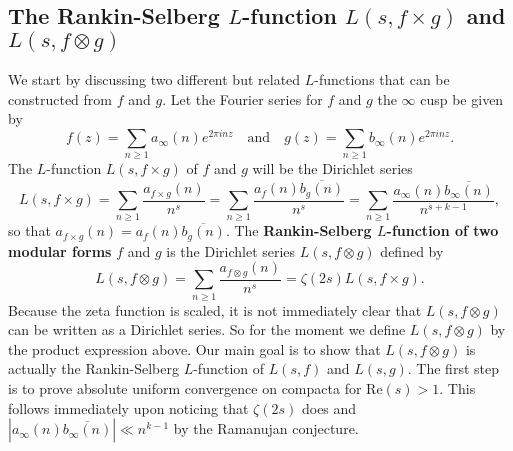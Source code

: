\documentclass[12pt]{book}
\theoremstyle{definition}\newframedtheorem{method}{Method}
\newcommand{\z}{\zeta}
\newcommand{\x}{\times}
\newcommand{\ox}{\otimes}
\newcommand{\<}{\langle}
\renewcommand{\>}{\rangle}
\newcommand{\conj}{\overline}
\renewcommand{\Re}{\mathrm{Re}}
\begin{document}
    \subsection*{The Rankin-Selberg \texorpdfstring{$L$}{L}-function \texorpdfstring{$L(s,f \x g)$}{L(s,fxg)} and \texorpdfstring{$L(s,f \ox g)$}{L(s,foxg)}}
      We start by discussing two different but related $L$-functions that can be constructed from $f$ and $g$. Let the Fourier series for $f$ and $g$ the $\infty$ cusp be given by
      \[
        f(z) = \sum_{n \ge 1}a_{\infty}(n)e^{2\pi inz} \quad \text{and} \quad g(z) = \sum_{n \ge 1}b_{\infty}(n)e^{2\pi inz}.
      \]
      The $L$-function $L(s,f \x g)$ of $f$ and $g$ will be the Dirichlet series
      \[
        L(s,f \x g) = \sum_{n \ge 1}\frac{a_{f \x g}(n)}{n^{s}} = \sum_{n \ge 1}\frac{a_{f}(n)\conj{b_{g}(n)}}{n^{s}} = \sum_{n \ge 1}\frac{a_{\infty}(n)\conj{b_{\infty}(n)}}{n^{s+k-1}},
      \]
      so that $a_{f \x g}(n) = a_{f}(n)\conj{b_{g}(n)}$. The \textbf{Rankin-Selberg $L$-function of two modular forms} $f$ and $g$ is the Dirichlet series $L(s,f \ox g)$ defined by
      \[
        L(s,f \ox g) = \sum_{n \ge 1}\frac{a_{f \ox g}(n)}{n^{s}} = \z(2s)L(s,f \x g).
      \]
      Because the zeta function is scaled, it is not immediately clear that $L(s,f \ox g)$ can be written as a Dirichlet series. So for the moment we define $L(s,f \ox g)$ by the product expression above. Our main goal is to show that $L(s,f \ox g)$ is actually the Rankin-Selberg $L$-function of $L(s,f)$ and $L(s,g)$. The first step is to prove absolute uniform convergence on compacta for $\Re(s) > 1$. This follows immediately upon noticing that $\z(2s)$ does and $|a_{\infty}(n)\conj{b_{\infty}(n)}| \ll n^{k-1}$ by the Ramanujan conjecture.
\end{document}
